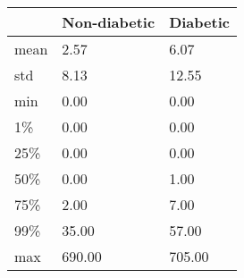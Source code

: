 \begin{tabular}{lll}
\toprule
{} & Non-diabetic & Diabetic \\
\midrule
mean &         2.57 &     6.07 \\
std  &         8.13 &    12.55 \\
min  &         0.00 &     0.00 \\
1\%   &         0.00 &     0.00 \\
25\%  &         0.00 &     0.00 \\
50\%  &         0.00 &     1.00 \\
75\%  &         2.00 &     7.00 \\
99\%  &        35.00 &    57.00 \\
max  &       690.00 &   705.00 \\
\bottomrule
\end{tabular}
